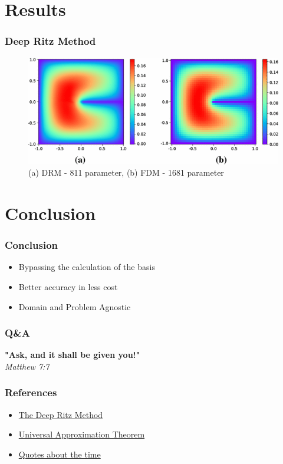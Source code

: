 \documentclass{beamer}
\begin{document}
\section{Results}

\begin{frame}
	\frametitle{Deep Ritz Method}
	\begin{figure}
		\caption{(a) DRM - 811 parameter, (b) FDM - 1681 parameter}
		\includegraphics[width=\textwidth,height=\textheight,keepaspectratio]{DRMvsFDM.png}

	\end{figure}
\end{frame}


\section{Conclusion}
\begin{frame}
	\frametitle{Conclusion}
	\begin{itemize}
		\item <1- > Bypassing the calculation of the basis
		\item <2- > Better accuracy in less cost
		\item <3- > Domain and Problem Agnostic
	\end{itemize}
\end{frame}

\begin{frame}
  \frametitle{Q\&A}
\textbf{"Ask, and it shall be given you!"}\centering\\
\em Matthew 7:7
\end{frame}
\begin{frame}
	\frametitle{References}
	\begin{itemize}
		\item \href{https://arxiv.org/pdf/1710.00211.pdf}{The Deep Ritz Method}
		\item \href{https://en.wikipedia.org/wiki/Universal_approximation_theorem}{Universal Approximation Theorem}
		\item \href{https://www.actitime.com/time-management/best-time-quotes/}{Quotes about the time}	
\end{itemize}
\end{frame}
\end{document}
